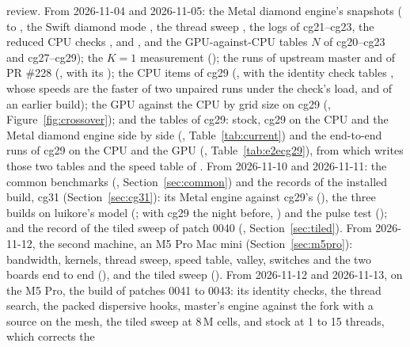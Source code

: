 \begin{itemize}
  review. From 2026-11-04 and 2026-11-05: the Metal diamond engine's snapshots
  ( to , the Swift
  diamond mode , the thread sweep , the
   logs of cg21--cg23, the reduced CPU checks ,  and
  , and the GPU-against-CPU tables $N$ of cg20--cg23 and cg27--cg29); the
  $K=1$ measurement (); the runs of upstream master
  and of PR \#228 (, with its ); the CPU items of cg29
  (, with the identity check tables , whose speeds are the
  faster of two unpaired runs under the check's load, and  of an earlier build); the GPU against
  the CPU by grid size on cg29 (, Figure~\ref{fig:crossover}); and the
  tables of cg29:
  stock, cg29 on the CPU and the Metal diamond engine side by side (,
  Table~\ref{tab:current}) and the end-to-end runs of cg29 on the CPU and the GPU
  (, Table~\ref{tab:e2ecg29}), from which 
  writes those two tables and the speed table of . From 2026-11-10 and 2026-11-11: the common
  benchmarks (, Section~\ref{sec:common}) and the records of the installed
  build, cg31 (Section~\ref{sec:cg31}): its Metal engine against cg29's (),
  the three builds on luikore's model (; with cg29 the night before,
  ) and the pulse test (); and the
  record of the tiled sweep of patch 0040 (, Section~\ref{sec:tiled}).
  From 2026-11-12, the second machine, an M5 Pro Mac mini (Section~\ref{sec:m5pro}): bandwidth, kernels, thread
  sweep, speed table, valley, switches and the two boards end to end (), and
  the tiled sweep (). From 2026-11-12 and 2026-11-13, on the M5 Pro, the build
  of patches 0041 to 0043: its identity checks, the thread search, the packed dispersive hooks, master's  engine
  against the fork with a source on the mesh, the tiled sweep at 8\,M cells, and stock at 1 to 15 threads, which corrects the

\end{itemize}
